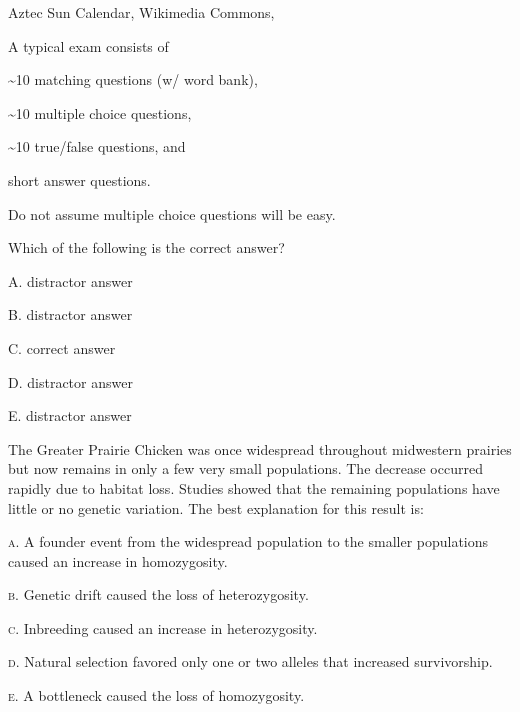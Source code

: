 \documentclass[t]{beamer}
\begin{document}
{
\begin{frame}[b]

\hfill \tiny Aztec Sun Calendar, Wikimedia Commons, 
\end{frame}
}


\begin{frame}{A typical exam consists of}

	\hangpara \textasciitilde10 matching questions (w/ word bank),
	
	\hangpara \textasciitilde10 multiple choice questions,
	
	\hangpara \textasciitilde10 true/false questions, and
	
	\hangpara short answer questions.
	
	\hangpara {}
\end{frame}
%

\begin{frame}{Do not assume multiple choice questions will be easy.}

\hangpara Which of the following is the correct answer?

\hangpara \quad A. distractor answer

\hangpara \quad B. distractor answer

\hangpara \quad C. correct answer

\hangpara \quad D. distractor answer

\hangpara \quad E. distractor answer


\end{frame}

\begin{frame}

The Greater Prairie Chicken was once widespread throughout midwestern prairies but now remains in only a few very small populations. The decrease occurred rapidly due to habitat loss. Studies showed that the remaining populations have little or no genetic variation. The best explanation for this result is:


\hangpara \textsc{a.} A founder event from the widespread population to the smaller populations caused an increase in homozygosity.

\hangpara \textsc{b.} Genetic drift caused the loss of heterozygosity. 

\hangpara \textsc{c.} Inbreeding caused an increase in heterozygosity. 

\hangpara \textsc{d.} Natural selection favored only one or two alleles that increased survivorship.

\hangpara \textsc{e.} A bottleneck caused the loss of homozygosity. %

\end{frame}
\end{document}
